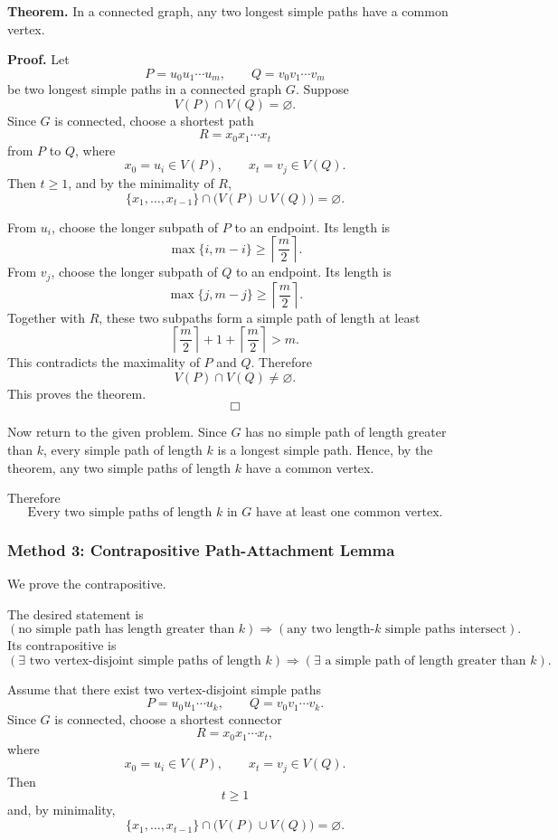 \documentclass[12pt]{article}
\begin{document}
\medskip
\noindent
\textbf{Theorem.}
In a connected graph, any two longest simple paths have a common vertex.

\medskip
\noindent
\textbf{Proof.}
Let
\[
P=u_0u_1\cdots u_m,
\qquad
Q=v_0v_1\cdots v_m
\]
be two longest simple paths in a connected graph \(G\). Suppose
\[
V(P)\cap V(Q)=\varnothing.
\]
Since \(G\) is connected, choose a shortest path
\[
R=x_0x_1\cdots x_t
\]
from \(P\) to \(Q\), where
\[
x_0=u_i\in V(P),
\qquad
x_t=v_j\in V(Q).
\]
Then \(t\ge 1\), and by the minimality of \(R\),
\[
\{x_1,\dots,x_{t-1}\}\cap \bigl(V(P)\cup V(Q)\bigr)=\varnothing.
\]

From \(u_i\), choose the longer subpath of \(P\) to an endpoint. Its length is
\[
\max\{i,m-i\}\ge \left\lceil \frac{m}{2}\right\rceil.
\]
From \(v_j\), choose the longer subpath of \(Q\) to an endpoint. Its length is
\[
\max\{j,m-j\}\ge \left\lceil \frac{m}{2}\right\rceil.
\]
Together with \(R\), these two subpaths form a simple path of length at least
\[
\left\lceil \frac{m}{2}\right\rceil
+1+
\left\lceil \frac{m}{2}\right\rceil
>m.
\]
This contradicts the maximality of \(P\) and \(Q\). Therefore
\[
V(P)\cap V(Q)\neq \varnothing.
\]
This proves the theorem.
\[
\Box
\]

Now return to the given problem. Since \(G\) has no simple path of length greater than \(k\), every simple path of length \(k\) is a longest simple path. Hence, by the theorem, any two simple paths of length \(k\) have a common vertex.

Therefore
\[
\boxed{\text{Every two simple paths of length }k\text{ in }G\text{ have at least one common vertex.}}
\]

\newpage
\subsubsection{Method 3: Contrapositive Path-Attachment Lemma}

We prove the contrapositive.

The desired statement is
\[
\left(
\text{no simple path has length greater than }k
\right)
\Longrightarrow
\left(
\text{any two length-}k\text{ simple paths intersect}
\right).
\]
Its contrapositive is
\[
\left(
\exists \text{ two vertex-disjoint simple paths of length }k
\right)
\Longrightarrow
\left(
\exists \text{ a simple path of length greater than }k
\right).
\]

Assume that there exist two vertex-disjoint simple paths
\[
P=u_0u_1\cdots u_k,
\qquad
Q=v_0v_1\cdots v_k.
\]
Since \(G\) is connected, choose a shortest connector
\[
R=x_0x_1\cdots x_t,
\]
where
\[
x_0=u_i\in V(P),
\qquad
x_t=v_j\in V(Q).
\]
Then
\[
t\ge 1
\]
and, by minimality,
\[
\{x_1,\dots,x_{t-1}\}\cap \bigl(V(P)\cup V(Q)\bigr)=\varnothing.
\]
\end{document}

